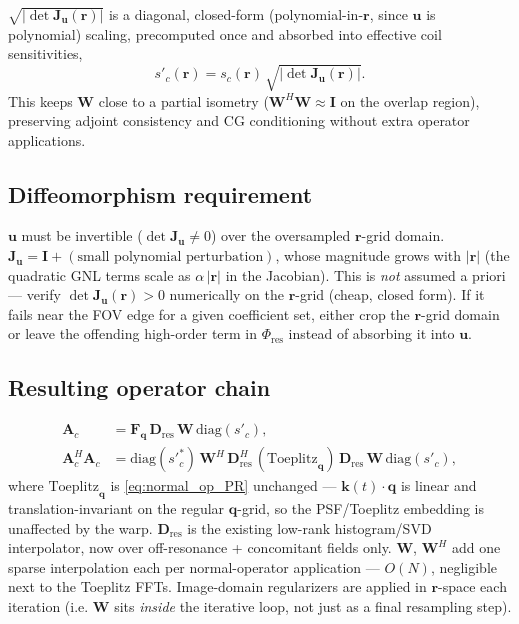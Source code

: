 \documentclass{article}
\begin{document}
$\sqrt{|\det\mathbf{J}_{\mathbf{u}}(\mathbf{r})|}$ is a diagonal, closed-form
(polynomial-in-$\mathbf{r}$, since $\mathbf{u}$ is polynomial) scaling, precomputed once and
absorbed into effective coil sensitivities,
\begin{equation}
    s'_c(\mathbf{r}) = s_c(\mathbf{r})\,\sqrt{|\det\mathbf{J}_{\mathbf{u}}(\mathbf{r})|}.
\end{equation}
This keeps $\mathbf{W}$ close to a partial isometry ($\mathbf{W}^H\mathbf{W}\approx
\mathbf{I}$ on the overlap region), preserving adjoint consistency and CG conditioning
without extra operator applications.

\subsection{Diffeomorphism requirement}

$\mathbf{u}$ must be invertible ($\det\mathbf{J}_{\mathbf{u}}\neq0$) over the oversampled
$\mathbf{r}$-grid domain. $\mathbf{J}_{\mathbf{u}} = \mathbf{I} + (\text{small polynomial
perturbation})$, whose magnitude grows with $|\mathbf{r}|$ (the quadratic GNL terms scale as
$\alpha\,|\mathbf{r}|$ in the Jacobian). This is \emph{not} assumed a priori — verify
$\det\mathbf{J}_{\mathbf{u}}(\mathbf{r})>0$ numerically on the $\mathbf{r}$-grid (cheap,
closed form). If it fails near the FOV edge for a given coefficient set, either crop the
$\mathbf{r}$-grid domain or leave the offending high-order term in $\Phi_{\mathrm{res}}$
instead of absorbing it into $\mathbf{u}$.

\subsection{Resulting operator chain}

\begin{align}
    \mathbf{A}_c &= \mathbf{F}_{\mathbf{q}}\,\mathbf{D}_{\mathrm{res}}\,\mathbf{W}\,
                    \mathrm{diag}(s'_c), \\
    \mathbf{A}_c^H\mathbf{A}_c &= \mathrm{diag}(s'^*_c)\,\mathbf{W}^H\,
                    \mathbf{D}_{\mathrm{res}}^H\,(\text{Toeplitz}_{\mathbf{q}})\,
                    \mathbf{D}_{\mathrm{res}}\,\mathbf{W}\,\mathrm{diag}(s'_c),
\end{align}
where $\text{Toeplitz}_{\mathbf{q}}$ is \eqref{eq:normal_op_PR} unchanged — $\mathbf{k}(t)\cdot\mathbf{q}$
is linear and translation-invariant on the regular $\mathbf{q}$-grid, so the PSF/Toeplitz
embedding is unaffected by the warp. $\mathbf{D}_{\mathrm{res}}$ is the existing low-rank
histogram/SVD interpolator, now over off-resonance + concomitant fields only. $\mathbf{W}$,
$\mathbf{W}^H$ add one sparse interpolation each per normal-operator application —
$O(N)$, negligible next to the Toeplitz FFTs. Image-domain regularizers are applied in
$\mathbf{r}$-space each iteration (i.e. $\mathbf{W}$ sits \emph{inside} the iterative loop,
not just as a final resampling step).
\end{document}
